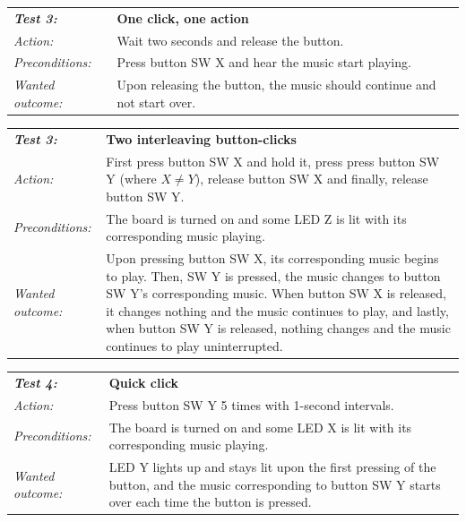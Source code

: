 \documentclass[a4paper,12pt]{article}
\begin{document}
\begin{tabular}[h]{|lp{12cm}|} \hline
\textbf{\emph{Test 3:}} 		& \textbf{One click, one action}\\
\emph{Action:} 		& Wait two seconds and release the button.\\
\emph{Preconditions:}	& Press button SW X and hear the music start playing.\\
\emph{Wanted outcome:}	& Upon releasing the button, the music should continue and not start over. \\ \hline
\end{tabular}
\vspace{1cm}

\begin{tabular}[h]{|lp{12cm}|} \hline
\textbf{\emph{Test 3:}} 		& \textbf{Two interleaving button-clicks}\\
\emph{Action:} 		& First press button SW X and hold it, press press button SW Y (where $X \neq Y$), release button SW X and finally, release button SW Y. \\
\emph{Preconditions:}	& The board is turned on and some LED Z is lit with its corresponding music playing.\\
\emph{Wanted outcome:}	& Upon pressing button SW X, its corresponding music begins to play. Then, SW Y is pressed, the music changes to button SW Y's corresponding music. When button SW X is released, it changes nothing and the music continues to play, and lastly, when button SW Y is released, nothing changes and the music continues to play uninterrupted. \\ \hline
\end{tabular}
\vspace{1cm}

\begin{tabular}[h]{|lp{12cm}|} \hline
\textbf{\emph{Test 4:}} 		& \textbf{Quick click}\\
\emph{Action:} 		& Press button SW Y 5 times with 1-second intervals.\\
\emph{Preconditions:}	& The board is turned on and some LED X is lit with its corresponding music playing.\\
\emph{Wanted outcome:}	& LED Y lights up and stays lit upon the first pressing of the button, and the music corresponding to button SW Y starts over each time the button is pressed.\\ \hline
\end{tabular}
\end{document}
